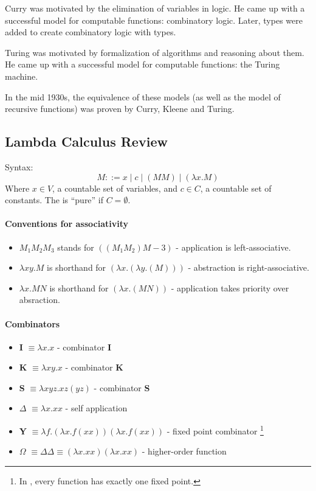 Curry was motivated by the elimination of variables in logic. He came up with a successful model for computable
functions: combinatory logic. Later, types were added to create combinatory logic with types.

Turing was motivated by formalization of algorithms and reasoning about them. He came up with a successful model for computable
functions: the Turing machine.

In the mid 1930s, the equivalence of these models (as well as the model of recursive functions) was proven by Curry, Kleene and
Turing.

\subsection{Lambda Calculus Review}
Syntax:
\[
M ::= x \mid c \mid (M M) \mid (\lambda x. M)
\]
Where $x\in V$, a countable set of variables, and $c\in C$, a countable set of constants. The \lc is ``pure'' if $C = \emptyset$.

\paragraph{Conventions for associativity}
\begin{itemize}
	\item $M_1 M_2 M_3$ stands for $((M_1 M_2) M-3)$ - application is left-associative.
	\item $\lambda xy. M$ is shorthand for $(\lambda x. (\lambda y. (M)))$ - abstraction is right-associative.
	\item $\lambda x. M N$ is shorthand for $(\lambda x. (M N))$ - application takes priority over absraction.
\end{itemize}

\paragraph{Combinators}
\begin{itemize}
	\item \textbf{I} $\equiv \lambda x. x$ - combinator \textbf{I}
	\item \textbf{K} $\equiv \lambda xy. x$ - combinator \textbf{K}
	\item \textbf{S} $\equiv \lambda xyz. xz (yz)$ - combinator \textbf{S}
	\item \textbf{$\Delta$} $\equiv \lambda x. xx$ - self application
	\item \textbf{Y} $\equiv \lambda f. (\lambda x. f (x x)) (\lambda x. f (x x))$ - fixed point combinator 
	\footnote{In \lc, every function has exactly one fixed point.}
	\item \textbf{$\Omega$} $\equiv \Delta \Delta \equiv (\lambda x. x x)(\lambda x. x x)$ - higher-order function
\end{itemize}


